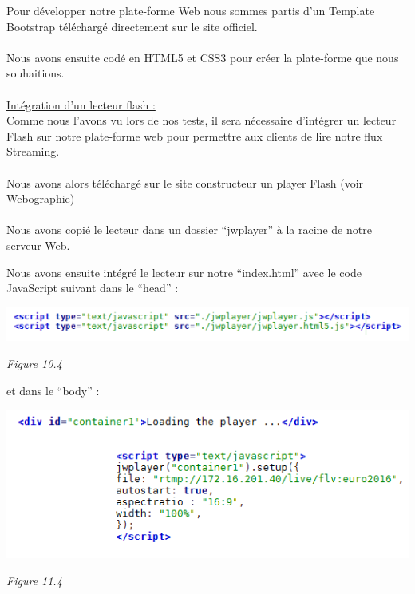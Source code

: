 \documentclass{report}
\begin{document}
     Pour développer notre plate-forme Web nous sommes partis d’un Template Bootstrap téléchargé directement sur le site officiel.
    \\
    \\
    Nous avons ensuite codé en HTML5 et CSS3 pour créer la plate-forme que nous souhaitions.
    \\
    \\
    
    \underline{Intégration d’un lecteur flash :}\\
    
    Comme nous l’avons vu lors de nos tests, il sera nécessaire d’intégrer un lecteur Flash sur notre plate-forme web pour permettre aux clients de lire notre flux Streaming.
    \\
    \\
    Nous avons alors téléchargé sur le site constructeur un player Flash (voir Webographie)
    \\
    \\
    Nous avons copié le lecteur dans un dossier “jwplayer” à la racine de notre serveur Web.

    \newpage

    Nous avons ensuite intégré le lecteur sur notre “index.html” avec le code JavaScript suivant dans le “head” :
    \\
    
    
    \begin{center}
    \includegraphics[width=16cm]{img/jw1.PNG}
    
    \textit{\small{Figure 10.4}}
    \end{center}
    
    
    \hfill
    
    et dans le “body” :
    \\
    
    \begin{center}
    \includegraphics[width=16cm]{img/jw2.PNG}
    
    \textit{\small{Figure 11.4}}
    \end{center}
    
\end{document}
